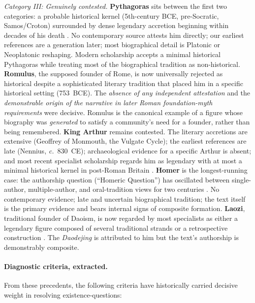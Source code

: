 \documentclass[12pt,oneside]{article}
\begin{document}
\textit{Category III: Genuinely contested.}
\textbf{Pythagoras} sits between the first two categories: a
probable historical kernel (5th-century BCE, pre-Socratic,
Samos/Croton) surrounded by dense legendary accretion beginning
within decades of his death \citep{Riedweg2005}.  No contemporary
source attests him directly; our earliest references are a
generation later; most biographical detail is Platonic or
Neoplatonic reshaping.  Modern scholarship accepts a minimal
historical Pythagoras while treating most of the biographical
tradition as non-historical.
\textbf{Romulus}, the supposed founder of Rome, is now universally
rejected as historical \citep{Beard2015,Wiseman1995} despite a
sophisticated literary tradition that placed him in a specific
historical setting (753~BCE).  The \textit{absence of any
independent attestation} and the \textit{demonstrable origin of the
narrative in later Roman foundation-myth requirements} were
decisive.  Romulus is the canonical example of a figure whose
biography was \textit{generated} to satisfy a community's need for a
founder, rather than being remembered.
\textbf{King Arthur} remains contested.  The literary accretions are
extensive (Geoffrey of Monmouth, the Vulgate Cycle); the earliest
references are late (Nennius, \textit{c.}~830~CE); archaeological
evidence for a specific Arthur is absent; and most recent specialist
scholarship regards him as legendary with at most a minimal
historical kernel in post-Roman Britain \citep{Higham2002}.
\textbf{Homer} is the longest-running case: the authorship question
(``Homeric Question'') has oscillated between single-author,
multiple-author, and oral-tradition views for two centuries
\citep{WestML2011,Finkelberg2005}.  No contemporary evidence; late
and uncertain biographical tradition; the text itself is the primary
evidence and bears internal signs of composite formation.
\textbf{Laozi}, traditional founder of Daoism, is now regarded by
most specialists as either a legendary figure composed of several
traditional strands or a retrospective construction
\citep{GrahamA1986}.  The \textit{Daodejing} is attributed to him
but the text's authorship is demonstrably composite.

\paragraph{Diagnostic criteria, extracted.}
From these precedents, the following criteria have historically
carried decisive weight in resolving existence-questions:
\end{document}
